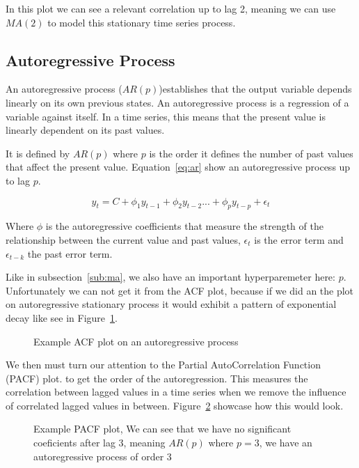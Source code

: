 \documentclass[journal]{IEEEtran}
\begin{document}
In this plot we can see a relevant correlation up to lag 2, meaning we can use
$MA(2)$ to model this stationary time series process.

\subsection{Autoregressive Process}\label{sub:ar}

An autoregressive process ($AR(p)$)establishes that the output variable
depends linearly on its own previous states. An autoregressive process is a
regression of a variable against itself. In a time series, this means that the
present value is linearly dependent on its past values. \cite{timeseries}

It is defined by $AR(p)$ where $p$ is the order it defines the number of past
values that affect the present value. Equation~\ref{eq:ar} show an
autoregressive process up to lag $p$.

\begin{equation}
    y_t = C + \phi_1 y_{t-1} + \phi_2 y_{t-2}
            ... +  \phi_p y_{t-p} + \epsilon_t
    \label{eq:ar}
\end{equation}

Where $\phi$ is the autoregressive coefficients that measure the strength of
the relationship between the current value and past values, $\epsilon_t$ is
the error term and $\epsilon_{t-k}$ the past error term.

Like in subsection~\ref{sub:ma}, we also have an important hyperparemeter
here: $p$. Unfortunately we can not get it from the ACF plot, because if we
did an the plot on autoregressive stationary process it would exhibit a
pattern of exponential decay\cite{timeseries} like see in
Figure~\ref{fig:acf-ar}.

\begin{figure}[htbp]
  \centering
  
    \caption{Example ACF plot on an autoregressive process}
  \label{fig:acf-ar}
\end{figure}

We then must turn our attention to the Partial AutoCorrelation Function (PACF)
plot. to get the order of the autoregression. This measures the correlation
between lagged values in a time series when we remove the influence of
correlated lagged values in between. Figure~\ref{fig:pacf} showcase how this
would look.

\begin{figure}[htbp]
  \centering
  
    \caption{Example PACF plot, We can see that we have no significant
        coeficients after lag 3, meaning $AR(p)$ where $p=3$, we have an
        autoregressive process of order 3}
    \label{fig:pacf}
\end{figure}
\end{document}

